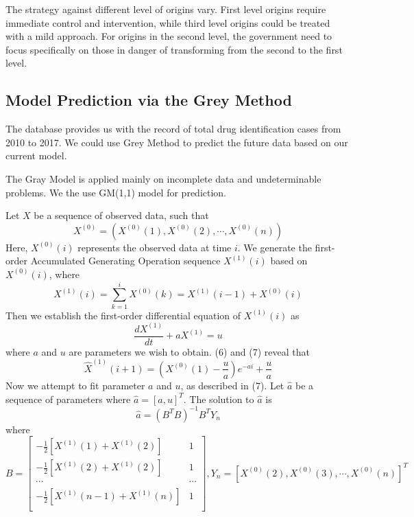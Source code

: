 The strategy against different level of origins vary. First level origins require immediate control and intervention, while third level origins could be treated with a mild approach. For origins in the second level, the government need to focus specifically on those in danger of transforming from the second to the first level.

\subsection{Model Prediction via the Grey Method}
The database provides us with the record of total drug identification cases from 2010 to 2017. We could use Grey Method to predict the future data based on our current model.

The Gray Model is applied mainly on incomplete data and undeterminable problems. We the use GM(1,1) model for prediction.\cite{13}

Let $X$ be a sequence of observed data, such that
\begin{equation}
X^{(0)} = (X^{(0)}(1),X^{(0)}(2),\cdots,X^{(0)}(n))
\end{equation}
Here, $X^{(0)}(i)$ represents the observed data at time $i$. We generate the first-order Accumulated Generating Operation sequence  $X^{(1)}(i)$ based on $X^{(0)}(i)$, where
\begin{equation}
X^{(1)}(i) = \sum_{k=1}^i X^{(0)}(k) = X^{(1)}(i-1)+X^{(0)}(i)
\end{equation}
Then we establish the first-order differential equation of $X^{(1)}(i)$ as
\begin{equation}
\frac{dX^{(1)}}{dt}+aX^{(1)}=u
\end{equation}
where $a$ and $u$ are parameters we wish to obtain. (6) and (7) reveal that
\begin{equation}
\hat{X}^{(1)}(i+1) = (X^{(0)}(1)-\frac{u}{a})e^{-ai}+\frac{u}{a}
\end{equation}
Now we attempt to fit parameter $a$ and $u$, as described in (7). Let $\hat{a}$ be a sequence of parameters where $\hat{a}=[a,u]^T$. The solution to $\hat{a}$ is
\begin{equation}
\hat{a} = (B^T B)^{-1}B^TY_n
\end{equation}
where
\begin{equation}
B=\left[
\begin{array}{cc}
-\frac{1}{2}[X^{(1)}(1)+X^{(1)}(2)] & 1\\
-\frac{1}{2}[X^{(1)}(2)+X^{(1)}(2)] & 1\\
\cdots & \cdots \\
-\frac{1}{2}[X^{(1)}(n-1)+X^{(1)}(n)] & 1\\
\end{array}
\right],
Y_n = [X^{(0)}(2),X^{(0)}(3),\cdots, X^{(0)}(n)]^T
\end{equation}






